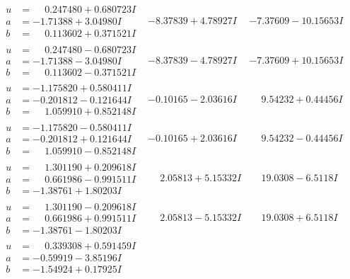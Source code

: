 \documentclass[1p]{elsarticle_modified}
\theoremstyle{definition}
\begin{document}
$$\begin{array}{c|c|c}
\begin{aligned}
u &= \phantom{-}0.247480 + 0.680723 I \\
a &= -1.71388 + 3.04980 I \\
b &= \phantom{-}0.113602 + 0.371521 I\end{aligned}
 & -8.37839 + 4.78927 I & -7.37609 - 10.15653 I \\ \hline\begin{aligned}
u &= \phantom{-}0.247480 - 0.680723 I \\
a &= -1.71388 - 3.04980 I \\
b &= \phantom{-}0.113602 - 0.371521 I\end{aligned}
 & -8.37839 - 4.78927 I & -7.37609 + 10.15653 I \\ \hline\begin{aligned}
u &= -1.175820 + 0.580411 I \\
a &= -0.201812 - 0.121644 I \\
b &= \phantom{-}1.059910 + 0.852148 I\end{aligned}
 & -0.10165 - 2.03616 I & \phantom{-}9.54232 + 0.44456 I \\ \hline\begin{aligned}
u &= -1.175820 - 0.580411 I \\
a &= -0.201812 + 0.121644 I \\
b &= \phantom{-}1.059910 - 0.852148 I\end{aligned}
 & -0.10165 + 2.03616 I & \phantom{-}9.54232 - 0.44456 I \\ \hline\begin{aligned}
u &= \phantom{-}1.301190 + 0.209618 I \\
a &= \phantom{-}0.661986 - 0.991511 I \\
b &= -1.38761 + 1.80203 I\end{aligned}
 & \phantom{-}2.05813 + 5.15332 I & \phantom{-}19.0308 - 6.5118 I \\ \hline\begin{aligned}
u &= \phantom{-}1.301190 - 0.209618 I \\
a &= \phantom{-}0.661986 + 0.991511 I \\
b &= -1.38761 - 1.80203 I\end{aligned}
 & \phantom{-}2.05813 - 5.15332 I & \phantom{-}19.0308 + 6.5118 I \\ \hline\begin{aligned}
u &= \phantom{-}0.339308 + 0.591459 I \\
a &= -0.59919 - 3.85196 I \\
b &= -1.54924 + 0.17925 I\end{aligned}

\end{array}$$
\end{document}
